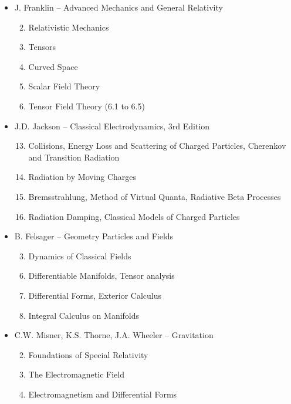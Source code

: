 \begin{itemize}
\item J. Franklin -- Advanced Mechanics and General Relativity
\begin{enumerate}
\setcounter{enumi}{1}
\item Relativistic Mechanics
\item Tensors
\item Curved Space
\item Scalar Field Theory
\item Tensor Field Theory (6.1 to 6.5)
\end{enumerate}

\item J.D. Jackson -- Classical Electrodynamics, 3rd Edition
\begin{enumerate}
\setcounter{enumi}{12}
\item Collisions, Energy Loss and Scattering of Charged Particles, Cherenkov and Transition Radiation
\item Radiation by Moving Charges
\item Bremsstrahlung, Method of Virtual Quanta, Radiative Beta Processes
\item Radiation Damping, Classical Models of Charged Particles
\end{enumerate}

\item B. Felsager -- Geometry Particles and Fields
\begin{enumerate}
\setcounter{enumi}{2}
\item Dynamics of Classical Fields
\end{enumerate}

\begin{enumerate}
\setcounter{enumi}{5}
\item Differentiable Manifolds, Tensor analysis
\item Differential Forms, Exterior Calculus
\item Integral Calculus on Manifolds
\end{enumerate}

\item C.W. Misner, K.S. Thorne, J.A. Wheeler -- Gravitation
\begin{enumerate}
\setcounter{enumi}{1}
\item Foundations of Special Relativity
\item The Electromagnetic Field
\item Electromagnetism and Differential Forms
\end{enumerate}


\end{itemize}
